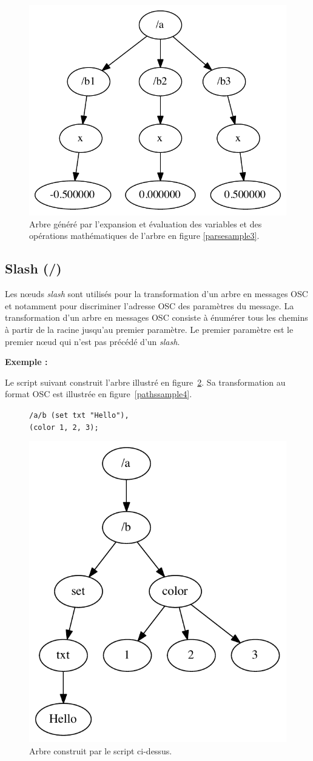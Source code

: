 \documentclass{article}
\newcommand{\exemple}	{\vspace*{1mm}\hspace*{-4mm}\textbf{Exemple :}}
\newcommand{\code}	[2][0.9]		{\vspace{0mm}\begin{center}\colorbox{mygrey}{
							\begin{minipage}[t]{#1\columnwidth} 
							{\small \texttt{#2}}
							\end{minipage}}\end{center}}
\newcommand{\uld}		{\hspace*{9mm}}
\begin{document}
\begin{figure}[htbp]
\begin{center}
\includegraphics[width=0.6\columnwidth]{eval/sample2}
\caption{Arbre généré par l'expansion et évaluation des variables et des opérations mathématiques de l'arbre en figure \ref{parsesample3}.}
\label{treesample3}
\end{center}
\end{figure}


\subsection{Slash (/)}\label{ssec:slash}

Les nœuds \emph{slash} sont utilisés pour la transformation d'un arbre en messages OSC et notamment pour discriminer l'adresse OSC des paramètres du message. La transformation d'un arbre en messages OSC consiste à énumérer tous les chemins à partir de la racine jusqu'au premier paramètre. Le premier paramètre est le premier nœud qui n'est pas précédé d'un \emph{slash}.

\exemple

Le script suivant construit l'arbre illustré en figure~\ref{evalsample4}. Sa transformation au format OSC est illustrée en figure~\ref{pathssample4}.
\begin{figure}[htbp]
\code{/a/b (set txt "Hello"),\\
\uld	 (color 1, 2, 3);
}
\begin{center}
\includegraphics[width=0.6\columnwidth]{eval/sample4}
\caption{Arbre construit par le script ci-dessus.}
\label{evalsample4}
\end{center}
\end{figure}
\end{document}
